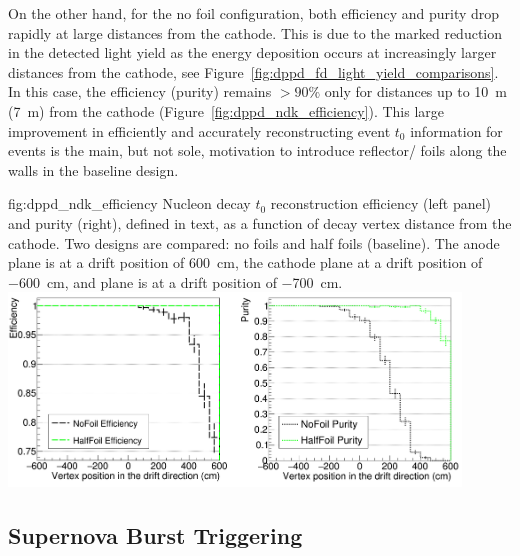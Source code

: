 On the other hand, for the no foil configuration, both efficiency and purity drop rapidly at large distances from the cathode. This is due to the marked reduction in the detected  light yield as the energy deposition occurs at increasingly larger distances from the cathode, see Figure~\ref{fig:dppd_fd_light_yield_comparisons}. In this case, the efficiency (purity) remains $>90\%$ only for distances up to \SI{10}{\m} (\SI{7}{\m}) from the cathode (Figure~\ref{fig:dppd_ndk_efficiency}). This large improvement in efficiently and accurately reconstructing event $t_0$ information for  events is the main, but not sole, motivation to introduce reflector/ foils along the  walls in the baseline design.

\begin{dunefigure}{fig:dppd_ndk_efficiency}
     {Nucleon decay $t_0$ reconstruction efficiency (left panel) and purity (right), defined in text, as a function of decay vertex distance from the cathode. Two  designs are compared: no foils and half foils (baseline). The anode plane is at a drift position of \SI{+600}{\cm}, the cathode plane at a drift position of \SI{-600}{\cm},  and  plane is at a drift position of \SI{-700}{\cm}.}
    \includegraphics[width=0.90\textwidth]{graphics/dppd_ndk_efficiency.png}
    \end{dunefigure}


\subsection{Supernova Burst Triggering}
\label{subsec:dp-pds-performance_trigger}

